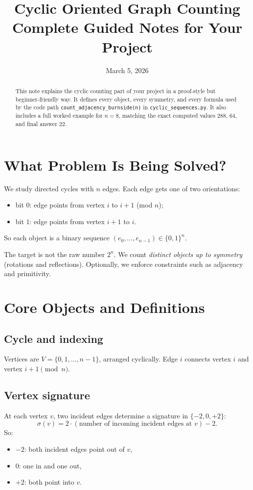 \documentclass[12pt]{article}
\title{Cyclic Oriented Graph Counting\\\large Complete Guided Notes for Your Project}
\author{}
\date{March 5, 2026}
\theoremstyle{definition}
\begin{document}
\maketitle

\begin{abstract}
This note explains the cyclic counting part of your project in a proof-style but beginner-friendly way. It defines every object, every symmetry, and every formula used by the code path \texttt{count\_adjacency\_burnside(n)} in \texttt{cyclic\_sequences.py}. It also includes a full worked example for \(n=8\), matching the exact computed values \(288\), \(64\), and final answer \(22\).
\end{abstract}

\tableofcontents

\section{What Problem Is Being Solved?}
We study directed cycles with \(n\) edges. Each edge gets one of two orientations:
\begin{itemize}
    \item bit \(0\): edge points from vertex \(i\) to \(i+1\) (mod \(n\));
    \item bit \(1\): edge points from vertex \(i+1\) to \(i\).
\end{itemize}
So each object is a binary sequence \((e_0,\dots,e_{n-1})\in\{0,1\}^n\).

The target is not the raw number \(2^n\). We count \emph{distinct objects up to symmetry} (rotations and reflections). Optionally, we enforce constraints such as adjacency and primitivity.

\section{Core Objects and Definitions}
\subsection{Cycle and indexing}
Vertices are \(V=\{0,1,\dots,n-1\}\), arranged cyclically. Edge \(i\) connects vertex \(i\) and vertex \(i+1\pmod n\).

\subsection{Vertex signature}
At each vertex \(v\), two incident edges determine a signature in \(\{-2,0,+2\}\):
\[
\sigma(v)=2\cdot(\text{number of incoming incident edges at }v)-2.
\]
So:
\begin{itemize}
    \item \(-2\): both incident edges point out of \(v\),
    \item \(0\): one in and one out,
    \item \(+2\): both point into \(v\).
\end{itemize}
\end{document}

